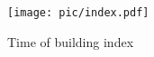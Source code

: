 \begin{figure}[H]
	\centering
	\texttt{[image: pic/index.pdf]}\\
	\caption{Time of building index}
	\label{index}
\end{figure}








